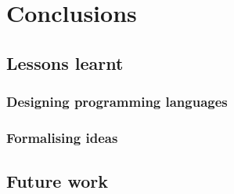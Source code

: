 \chapter{Conclusions}

\section{Lessons learnt}

\subsection{Designing programming languages}

\subsection{Formalising ideas}

\section{Future work}
